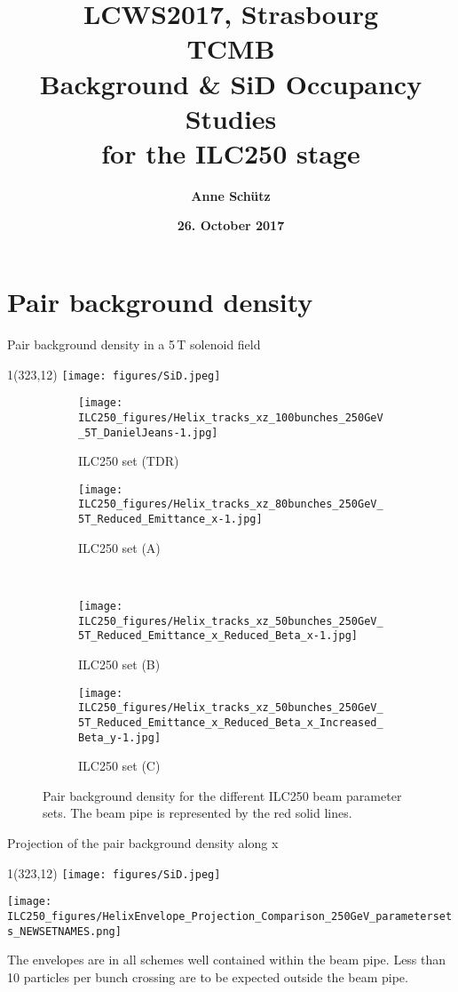 \documentclass[xcolor={dvipsnames}]{beamer}
\title[TCMB, ILC250 SiD Occupancy]{\textbf{\alert{LCWS2017, Strasbourg\\TCMB} \\ \vspace*{0.5cm}  Background \& SiD Occupancy Studies\\for the ILC250 stage}}
\author{\textbf{Anne Sch\"utz}}
\institute{\textbf{DESY}}
\date{\textbf{26. October 2017}}
\newcommand{\sidlogo}{
  \setlength{\TPHorizModule}{1pt}
  \setlength{\TPVertModule}{1pt}
  \begin{textblock}{1}(323,12)
   \texttt{[image: figures/SiD.jpeg]}
  \end{textblock}
  }
\begin{document}
{
\begin{frame}
  \titlepage
\end{frame}
}

\section{Pair background density}

\begin{frame}{Pair background density in a 5\,T solenoid field}
\sidlogo
 \begin{figure}
\centering
\begin{subfigure}[t]{0.35\textwidth}
\centering
\texttt{[image: ILC250\_figures/Helix\_tracks\_xz\_100bunches\_250GeV\_5T\_DanielJeans-1.jpg]}
\caption{ILC250 set (TDR)}
\end{subfigure}
\hspace*{0.1cm}
\begin{subfigure}[t]{0.35\textwidth}
\centering
\texttt{[image: ILC250\_figures/Helix\_tracks\_xz\_80bunches\_250GeV\_5T\_Reduced\_Emittance\_x-1.jpg]}
\caption{ILC250 set (A)}
\end{subfigure}
\\
\begin{subfigure}[t]{0.35\textwidth}
\centering
\texttt{[image: ILC250\_figures/Helix\_tracks\_xz\_50bunches\_250GeV\_5T\_Reduced\_Emittance\_x\_Reduced\_Beta\_x-1.jpg]}
\caption{ILC250 set (B)}
\end{subfigure}
\hspace*{0.1cm}
\begin{subfigure}[t]{0.35\textwidth}
\centering
\texttt{[image: ILC250\_figures/Helix\_tracks\_xz\_50bunches\_250GeV\_5T\_Reduced\_Emittance\_x\_Reduced\_Beta\_x\_Increased\_Beta\_y-1.jpg]}
\caption{ILC250 set (C)}
\end{subfigure}
\caption{Pair background density for the different ILC250 beam parameter sets.
The beam pipe is represented by the red solid lines.}
\label{fig:Envelopes}
\end{figure}

\end{frame}

\begin{frame}{Projection of the pair background density along x}
\sidlogo
\begin{center}
 \texttt{[image: ILC250\_figures/HelixEnvelope\_Projection\_Comparison\_250GeV\_parametersets\_NEWSETNAMES.png]}
\end{center}
The envelopes are in all schemes well contained within the beam pipe. Less than 10 particles per bunch crossing are to be expected outside the beam pipe.
\end{frame}
\end{document}
